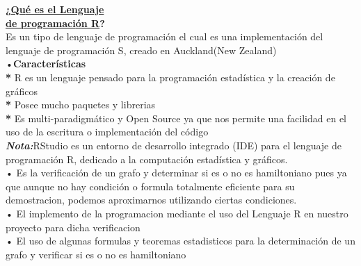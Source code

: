 \documentclass[journal]{IEEEtran}
\begin{document}
\textbf{¿\underline{Qu{\'e} es el Lenguaje}}\\
\textbf{\underline{de programaci{\'o}n R}?}\\
Es un tipo de lenguaje de programaci{\'o}n el cual es una implementaci{\'o}n del lenguaje de programaci{\'o}n S, creado en Auckland(New Zealand)\\
•\textbf{Caracter{\'i}sticas}\\
\textbf{*} R es un lenguaje pensado para la programaci{\'o}n estad{\'i}stica y la creaci{\'o}n de gr{\'a}ficos\\
\textbf{*} Posee mucho paquetes y librerias\\
\textbf{*} Es multi-paradigm{\'a}tico y Open Source ya que nos permite una facilidad en el uso de la escritura o implementaci{\'o}n del c{\'o}digo\\
\textit{\textbf{Nota:}}RStudio es un entorno de desarrollo integrado (IDE) para el lenguaje de programación R, dedicado a la computación estadística y gráficos.\\

• Es la verificaci{\'o}n de un grafo y determinar si es o no es hamiltoniano  pues ya que aunque no hay condici{\'o}n o formula totalmente eficiente para su demostracion, podemos aproximarnos utilizando ciertas condiciones.\\
• El implemento de la programacion mediante el uso del Lenguaje R en nuestro proyecto para dicha verificacion\\
• El uso de algunas formulas y teoremas estadisticos para la determinaci{\'o}n de un grafo y verificar si es o no es hamiltoniano\\[6cm]

 
\end{document}
